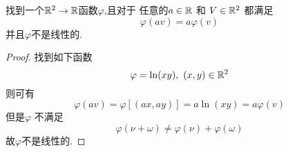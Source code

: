 \begin{problem}{8}
  找到一个$\mathbb{R}^2\rightarrow\mathbb{R} $函数$\varphi$,且对于
  任意的$a\in\mathbb{R}$ 和 $V\in\mathbb{R}^2$ 都满足
  \begin{displaymath}
    \varphi(av)=a \varphi(v)
  \end{displaymath}
  并且$\varphi$不是线性的.
\end{problem}

\begin{proof}
  找到如下函数
  \begin{displaymath}
    \varphi = \ln(xy) ,\ (x,y)\in \mathbb{R}^2
  \end{displaymath}
  则可有
  \begin{displaymath}
    \varphi(av) = \varphi[(ax,ay)] = a\ln(xy) = a \varphi(v)
  \end{displaymath}
  但是$\varphi$ 不满足
  \begin{displaymath}
    \varphi(\nu+\omega) \neq \varphi(\nu) +\varphi(\omega)
  \end{displaymath}
  故$\varphi$不是线性的.
  
\end{proof}

